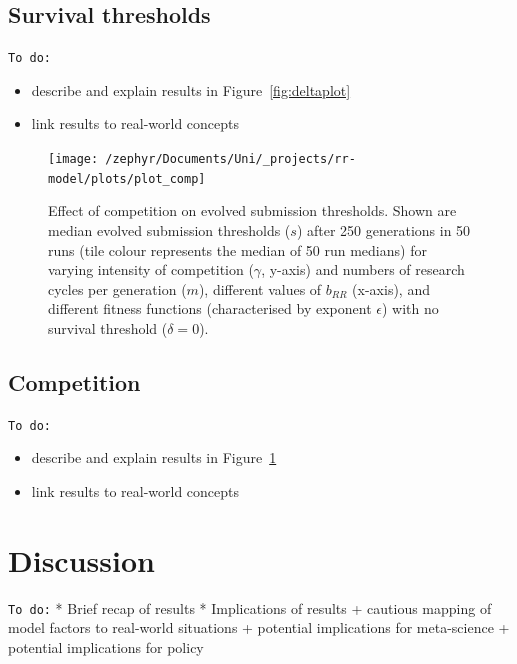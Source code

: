 \documentclass[british,,man,mask,floatsintext]{apa6}
\providecommand{\tightlist}{%
  \setlength{\itemsep}{0pt}\setlength{\parskip}{0pt}}
\begin{document}
\hypertarget{survival-thresholds}{%
\subsection{Survival thresholds}\label{survival-thresholds}}

\texttt{To\ do:}

\begin{itemize}
\tightlist
\item
  describe and explain results in Figure~\ref{fig:deltaplot}
\item
  link results to real-world concepts
\end{itemize}



\begin{figure}
\texttt{[image: /zephyr/Documents/Uni/\_projects/rr-model/plots/plot\_comp]} \caption{Effect of competition on evolved submission thresholds. Shown are median evolved submission thresholds (\(s\)) after 250 generations in 50 runs (tile colour represents the median of 50 run medians) for varying intensity of competition (\(\gamma\), y-axis) and numbers of research cycles per generation (\(m\)), different values of \(b_{RR}\) (x-axis), and different fitness functions (characterised by exponent \(\epsilon\)) with no survival threshold (\(\delta = 0\)).}\label{fig:competitionplot}
\end{figure}

\hypertarget{competition}{%
\subsection{Competition}\label{competition}}

\texttt{To\ do:}

\begin{itemize}
\tightlist
\item
  describe and explain results in Figure~\ref{fig:competitionplot}
\item
  link results to real-world concepts
\end{itemize}

\hypertarget{discussion}{%
\section{Discussion}\label{discussion}}

\texttt{To\ do:}
* Brief recap of results
* Implications of results
+ cautious mapping of model factors to real-world situations
+ potential implications for meta-science
+ potential implications for policy
\end{document}
